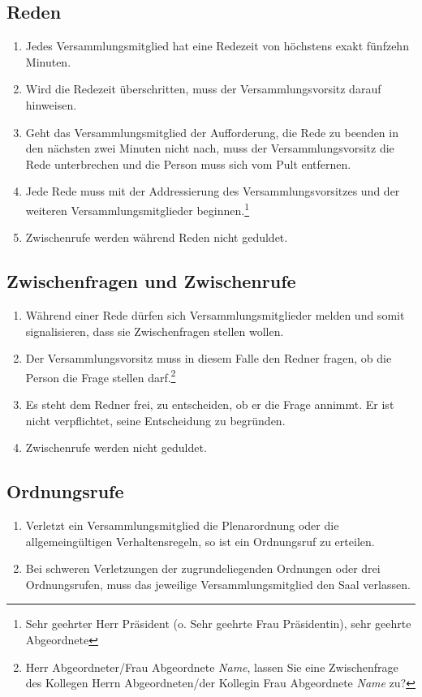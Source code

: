 \documentclass{article}
\begin{document}
\subsection{Reden}
\begin{enumerate}[(1)]
	\item Jedes Versammlungsmitglied hat eine Redezeit von höchstens exakt fünfzehn Minuten.
	\item Wird die Redezeit überschritten, muss der Versammlungsvorsitz darauf hinweisen.
	\item Geht das Versammlungsmitglied der Aufforderung, die Rede zu beenden in den nächsten zwei Minuten nicht nach, muss der Versammlungsvorsitz die Rede unterbrechen und die Person muss sich vom Pult entfernen.
	\item Jede Rede muss mit der Addressierung des Versammlungsvorsitzes und der weiteren Versammlungsmitglieder beginnen.\footnote{Sehr geehrter Herr Präsident (o. Sehr geehrte Frau Präsidentin), sehr geehrte Abgeordnete}
	\item Zwischenrufe werden während Reden nicht geduldet.
\end{enumerate}

\subsection{Zwischenfragen und Zwischenrufe}
\begin{enumerate}[(1)]
	\item Während einer Rede dürfen sich Versammlungsmitglieder melden und somit signalisieren, dass sie Zwischenfragen stellen wollen.
	\item Der Versammlungsvorsitz muss in diesem Falle den Redner fragen, ob die Person die Frage stellen darf.\footnote{Herr Abgeordneter/Frau Abgeordnete \textit{Name}, lassen Sie eine Zwischenfrage des Kollegen Herrn Abgeordneten/der Kollegin Frau Abgeordnete \textit{Name} zu?}
	\item Es steht dem Redner frei, zu entscheiden, ob er die Frage annimmt. Er ist nicht verpflichtet, seine Entscheidung zu begründen.
	\item Zwischenrufe werden nicht geduldet.
\end{enumerate}

\subsection{Ordnungsrufe}
\begin{enumerate}[(1)]
	\item Verletzt ein Versammlungsmitglied die Plenarordnung oder die allgemeingültigen Verhaltensregeln, so ist ein Ordnungsruf zu erteilen.
	\item Bei schweren Verletzungen der zugrundeliegenden Ordnungen oder drei Ordnungsrufen, muss das jeweilige Versammlungsmitglied den Saal verlassen.
\end{enumerate}
\end{document}
